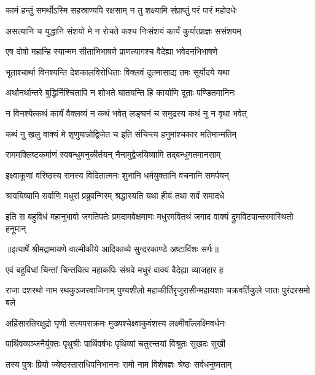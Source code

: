 \twolineshloka
{कामं हन्तुं समर्थोऽस्मि सहस्राण्यपि रक्षसाम्}
{न तु शक्ष्यामि संप्राप्तुं परं पारं महोदधेः} %

\twolineshloka
{असत्यानि च युद्धानि संशयो मे न रोचते}
{कश्च निःसंशयं कार्यं कुर्यात्प्राज्ञः ससंशयम्} %

\twolineshloka
{एष दोषो महान्हि स्यान्मम सीताभिभाषणे}
{प्राणत्यागश्च वैदेह्या भवेदनभिभाषणे} %

\twolineshloka
{भूताश्चार्था विनश्यन्ति देशकालविरोधिताः}
{विक्लवं दूतमासाद्य तमः सूर्योदये यथा} %

\twolineshloka
{अर्थानर्थान्तरे बुद्धिर्निश्चितापि न शोभते}
{घातयन्ति हि कार्याणि दूताः पण्डितमानिनः} %

\twolineshloka
{न विनश्येत्कथं कार्यं वैक्लव्यं न कथं भवेत्}
{लङ्घनं च समुद्रस्य कथं नु न वृथा भवेत्} %

\twolineshloka
{कथं नु खलु वाक्यं मे शृणुयान्नोद्विजेत च}
{इति संचिन्त्य हनुमांश्चकार मतिमान्मतिम्} %

\twolineshloka
{राममक्लिष्टकर्माणं स्वबन्धुमनुकीर्तयन्}
{नैनामुद्वेजयिष्यामि तद्बन्धुगतमानसाम्} %

\twolineshloka
{इक्ष्वाकूणां वरिष्ठस्य रामस्य विदितात्मनः}
{शुभानि धर्मयुक्तानि वचनानि समर्पयन्} %

\twolineshloka
{श्रावयिष्यामि सर्वाणि मधुरां प्रब्रुवन्गिरम्}
{श्रद्धास्यति यथा हीयं तथा सर्वं समादधे} %

\fourlineindentedshloka
{इति स बहुविधं महानुभावो}
{ जगतिपतेः प्रमदामवेक्षमाणः}
{मधुरमवितथं जगाद वाक्यं}
{ द्रुमविटपान्तरमास्थितो हनूमान्} %


{॥इत्यार्षे श्रीमद्रामायणे वाल्मीकीये आदिकाव्ये सुन्दरकाण्डे अष्टाविंशः सर्गः॥}


\twolineshloka
{एवं बहुविधां चिन्तां चिन्तयित्व महाकपिः}
{संश्रवे मधुरं वाक्यं वैदेह्या व्याजहार ह} %

\threelineshloka
{राजा दशरथो नाम रथकुञ्जरवाजिनाम्}
{पुण्यशीलो महाकीर्तिरृजुरासीन्महायशाः}
{चक्रवर्तिकुले जातः पुरंदरसमो बले} %

\twolineshloka
{अहिंसारतिरक्षुद्रो घृणी सत्यपराक्रमः}
{मुख्यश्चेक्ष्वाकुवंशस्य लक्ष्मीवाँल्लक्ष्मिवर्धनः} %

\twolineshloka
{पार्थिवव्यञ्जनैर्युक्तः पृथुश्रीः पार्थिवर्षभः}
{पृथिव्यां चतुरन्तयां विश्रुतः सुखदः सुखी} %

\twolineshloka
{तस्य पुत्रः प्रियो ज्येष्ठस्ताराधिपनिभाननः}
{रामो नाम विशेषज्ञः श्रेष्ठः सर्वधनुष्मताम्} %


